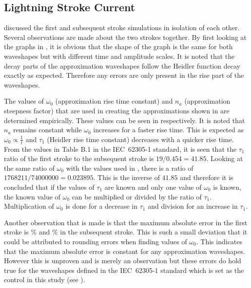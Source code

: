 \subsection{Lightning Stroke Current}
\label{sub:discussion_lightning_stroke_current}
 discussed the first and subsequent stroke simulations in isolation of each other. Several observations are made about the two strokes together. By first looking at the graphs in , it is obvious that the shape of the graph is the same for both waveshapes but with different time and amplitude scales. It is noted that the decay parts of the approximation waveshapes follow the Heidler function decay exactly as expected. Therefore any errors are only present in the rise part of the waveshapes.

The values of $\omega_0$ (approximation rise time constant) and $n_a$ (approximation steepness factor) that are used in creating the approximations shown in  are determined empirically. These values can be seen in  respectively. It is noted that $n_a$ remains constant while $\omega_0$ increases for a faster rise time. This is expected as $\omega_0 \propto \frac{1}{t}$ and $\tau_1$ (Heidler rise time constant) decreases with a quicker rise time. From the values in Table B.1 in the IEC~62305-1 standard, it is seen that the $\tau_1$ ratio of the first stroke to the subsequent stroke is $19/0.454 = 41.85$. Looking at the same ratio of $\omega_0$ with the values used in , there is a ratio of $1 768 211/74 000 000 = 0.023895$. This is the inverse of $41.85$ and therefore it is concluded that if the values of $\tau_1$ are known and only one value of $\omega_0$ is known, the known value of $\omega_0$ can be multiplied or divided by the ratio of $\tau_1$. Multiplication of $\omega_0$ is done for a decrease in $\tau_1$ and division for an increase in $\tau_1$.

Another observation that is made is that the maximum absolute error in the first stroke is \unskip \% and \unskip \% in the subsequent stroke. This is such a small deviation that it could be attributed to rounding errors when finding values of $\omega_0$. This indicates that the maximum absolute error is constant for any approximation waveshapes. However this is unproven and is merely an observation but these errors do hold true for the waveshapes defined in the IEC~62305-1 standard which is set as the control in this study (see ).

